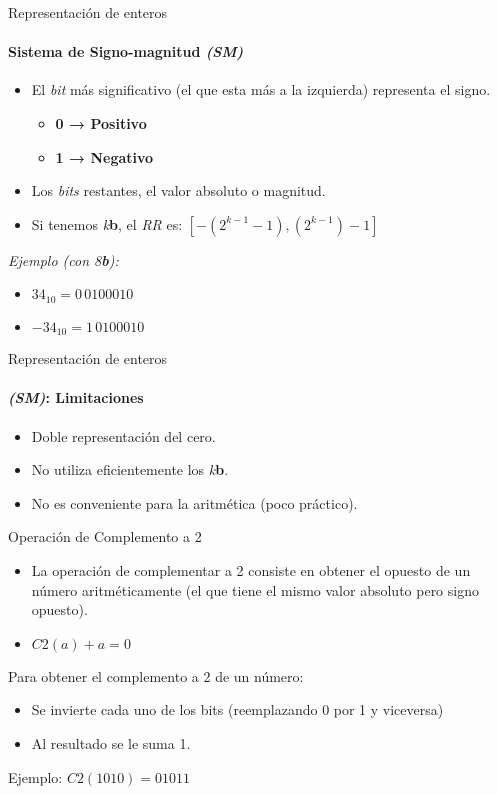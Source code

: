 \documentclass[11pt,a4paper,spanish]{beamer}
\newcommand{\bit}{\textbf{b}}
\begin{document}
\begin{frame}{Representación de enteros}
    \framesubtitle{Sistema de Signo-magnitud \emph{(SM)}}

    \begin{itemize}
        \item El \emph{bit} más significativo (el que esta más a la izquierda)
            representa el signo.
            \begin{itemize}
                \item \textbf{0 → Positivo}
                \item \textbf{1 → Negativo}
            \end{itemize}
        \item Los \emph{bits} restantes, el valor absoluto o magnitud.
        \item Si tenemos \emph{k}\bit, el \emph{RR} es:
            $[-(2^{k-1}-1),(2^{k-1})-1]$
    \end{itemize}\pause
    \emph{Ejemplo (con 8\bit{}):}
        \begin{itemize}
            \item $34_{10} = 0\, 0100010$
            \item $-34_{10} = 1\, 0100010$
        \end{itemize}
\end{frame}

\begin{frame}{Representación de enteros}
    \framesubtitle{\emph{(SM)}: Limitaciones}
    \begin{itemize}
        \item Doble representación del cero.
        \item No utiliza eficientemente los \emph{k}\bit{}.
        \item No es conveniente para la aritmética (poco práctico).
\end{itemize}
\end{frame}

\begin{frame}{Operación de Complemento a 2}
\begin{itemize}
    \item La operación de complementar a 2 consiste en obtener el opuesto de
        un número aritméticamente (el que tiene el mismo valor absoluto pero
        signo opuesto).
    \item $ C2(a) + a = 0 $
\end{itemize} \pause

    Para obtener el complemento a 2 de un número:
    
    \begin{itemize}
    \item Se invierte cada uno de los bits (reemplazando 0 por 1 y viceversa)
    \item Al resultado se le suma 1.
    \end{itemize}
    Ejemplo: $C2(1010) = 01011$
\end{frame}
\end{document}
